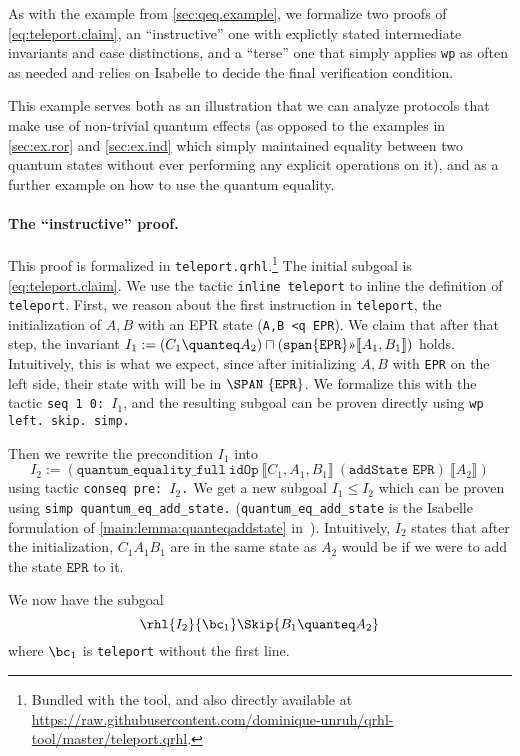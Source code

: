 \documentclass{article}
\newcommand\giturl[1]{\url{https://raw.githubusercontent.com/dominique-unruh/qrhl-tool/master/#1}}
\newcommand\qrhlautoref[1]{\autoref{main:#1} in~\cite{qrhl-paper-from-manual}}
\begin{document}
As with the example from \autoref{sec:qeq.example}, we formalize two
proofs of \eqref{eq:teleport.claim}, an ``instructive'' one with
explictly stated intermediate invariants and case distinctions, and a
``terse'' one that simply applies \texttt{wp} as often as needed and
relies on Isabelle to decide the final verification condition.

This example serves both as an illustration that we can analyze
protocols that make use of non-trivial quantum effects (as opposed to
the examples in \autoref{sec:ex.ror} and \autoref{sec:ex.ind} which
simply maintained equality between two quantum states without ever
performing any explicit operations on it), and as a further example on
how to use the quantum equality.

\paragraph{The ``instructive'' proof.} This proof is formalized in \texttt{teleport.qrhl}.\footnote{Bundled with the tool, and also directly available at \giturl{teleport.qrhl}.}
The initial subgoal is \eqref{eq:teleport.claim}. We use the tactic
\texttt{inline teleport} to inline the definition of
\texttt{teleport}. First, we reason about the first instruction in
\texttt{teleport}, the initialization of $A,B$
with an EPR state (\texttt{A,B <q EPR}). We claim that after that
step, the invariant
$I_1:={(C_1\quanteq A_2) \sqcap (\mathtt{span}
\{\mathtt{EPR}\}\text\guillemotright\llbracket A_1,B_1\rrbracket)}$
holds. Intuitively, this is what we expect, since after initializing
$A,B$
with \texttt{EPR} on the left side, their state with will be in
$\SPAN\ \{\mathtt{EPR}\}$.
We formalize this with the tactic \texttt{seq 1 0: $I_1$},
and the resulting subgoal can be proven directly using
\texttt{\frenchspacing wp left. skip. simp.}

Then we rewrite the precondition $I_1$
into
\[
  I_2:=(\mathtt{quantum\_equality\_full}\ \mathtt{idOp}\ ⟦C_1,A_1,B_1⟧\
  (\texttt{addState EPR})\ ⟦A_2⟧)
\] using tactic \texttt{\frenchspacing conseq pre: $I_2$.}
We get a new subgoal $I_1\leq I_2$
which can be proven using \texttt{simp quantum\_eq\_add\_state.}
(\texttt{quantum\_eq\_add\_state} is the Isabelle formulation of
\qrhlautoref{lemma:quanteqaddstate}). Intuitively, $I_2$
states that after the initialization, $C_1A_1B_1$
are in the same state as $A_2$
would be if we were to add the state $\mathtt{EPR}$ to it.


We now have the subgoal
\[
\rhl{I_2}{\bc_1}\Skip{B_1\quanteq A_2}
\]
where $\bc_1$ is \texttt{teleport} without the first line.
\end{document}
